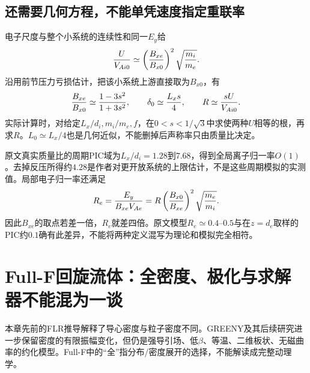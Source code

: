 \documentclass[UTF8,a4paper,11pt,openany,fontset=fandol]{ctexbook}
\begin{document}
\subsection{还需要几何方程，不能单凭速度指定重联率}
电子尺度与整个小系统的连续性和同一$E_y$给
\begin{equation}
 {U\over V_{Ai0}}\simeq\left({B_{xe}\over B_{x0}}\right)^2
 \sqrt{m_i\over m_e}.
\end{equation}
沿用前节压力亏损估计，把该小系统上游直接取为$B_{x0}$，有
\begin{equation}
 {B_{xe}\over B_{x0}}\simeq{1-3s^2\over1+3s^2},\qquad
 \delta_0\simeq{L_xs\over4},\qquad R\simeq{sU\over V_{Ai0}}.
\end{equation}
实际计算时，对给定$L_x/d_i,m_i/m_e,f$，在$0<s<1/\sqrt3$中求使两种$U$相等的根，再求$R$。$L_0\simeq L_x/4$也是几何近似，不能删掉后声称率只由质量比决定。

原文真实质量比的周期PIC域为$L_x/d_i=1.28$到$7.68$，得到全局离子归一率$O(1)$。去掉反压所得约$4.28$是作者对更开放系统的上限估计，不是这些周期模拟的实测值。局部电子归一率还满足
\begin{equation}
 R_e={E_y\over B_{xe}V_{Ae}}
 =R\left({B_{x0}\over B_{xe}}\right)^2\sqrt{m_e\over m_i}.
\end{equation}
因此$B_{xe}$的取点若差一倍，$R_e$就差四倍。原文模型$R_e\simeq0.4$--$0.5$与在$z=d_e$取样的PIC约$0.1$确有此差异，不能将两种定义混写为理论和模拟完全相符。

\section{Full-F回旋流体：全密度、极化与求解器不能混为一谈}
\label{sec:remaining-fullf}
本章先前的FLR推导解释了导心密度与粒子密度不同。GREENY及其后续研究\citep{E473,L314}进一步保留密度的有限振幅变化，但仍是强导引场、低$\beta$、等温、二维板状、无磁曲率的约化模型。Full-F中的“全”指分布/密度展开的选择，不能解读成完整动理学。
\end{document}
